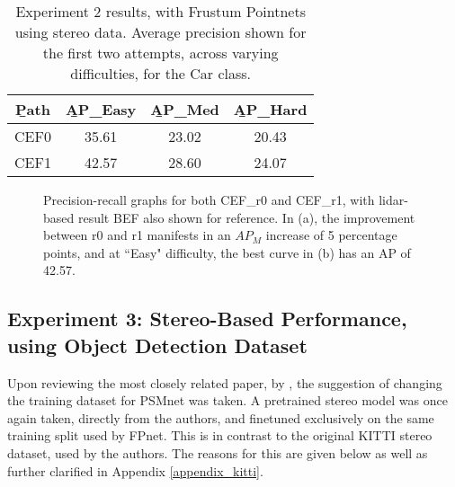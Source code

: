 \begin{table}[ht]
	\centering
	\caption{Experiment 2 results, with Frustum Pointnets using stereo data. Average precision shown for the first two attempts, across varying difficulties, for the Car class.}
	\begin{tabular}{|c|c|c|c|}
		\hline
		\b{Path} & \b{AP\_Easy} & \b{AP\_Med} & \b{AP\_Hard} \\ \hline
		CEF0   &    35.61     &    23.02    &    20.43     \\ \hline
		CEF1   &    42.57     &    28.60    &    24.07     \\ \hline
	\end{tabular}
	\label{fpnet_ap2}
\end{table}

\begin{figure}[H]
	\centering
	\caption{Precision-recall graphs for both CEF\_r0 and CEF\_r1, with lidar-based result BEF also shown for reference. In (a), the improvement between r0 and r1 manifests in an $AP_M$ increase of 5 percentage points, and at ``Easy" difficulty, the best curve in (b) has an AP of 42.57.}
	\label{fpnet_pr2}
\end{figure}

\subsection{Experiment 3: Stereo-Based Performance, using Object Detection Dataset}
Upon reviewing the most closely related paper, by \cite{wang_pseudo-lidar_2019}, the suggestion of changing the training dataset for PSMnet was taken. A pretrained stereo model was once again taken, directly from the authors, and finetuned exclusively on the same training split used by FPnet. This is in contrast to the original KITTI stereo dataset, used by the authors. The reasons for this are given below as well as further clarified in Appendix \ref{appendix_kitti}.

